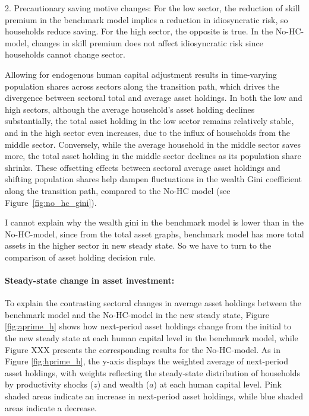 \documentclass[12pt]{article}
\begin{document}
2. Precautionary saving motive changes:
For the low sector, the reduction of skill premium in the benchmark model implies a reduction in idiosyncratic risk, so households reduce saving. For the high sector, the opposite is true. In the No-HC-model, changes in skill premium does not affect idiosyncratic risk since households cannot change sector. 


Allowing for endogenous human capital adjustment results in time-varying population shares across sectors along the transition path, which drives the divergence between sectoral total and average asset holdings. In both the low and high sectors, although the average household’s asset holding declines substantially, the total asset holding in the low sector remains relatively stable, and in the high sector even increases, due to the influx of households from the middle sector. Conversely, while the average household in the middle sector saves more, the total asset holding in the middle sector declines as its population share shrinks. These offsetting effects between sectoral average asset holdings and shifting population shares help dampen fluctuations in the wealth Gini coefficient along the transition path, compared to the No-HC model (see Figure~\ref{fig:no_hc_gini}).

{\color{red} I cannot explain why the wealth gini in the benchmark model is lower than in the No-HC-model, since from the total asset graphs, benchmark model has more total assets in the higher sector in new steady state. So we have to turn to the comparison of asset holding decision rule. }

\paragraph{Steady-state change in asset investment:} To explain the contrasting sectoral changes in average asset holdings between the benchmark model and the No-HC-model in the new steady state, Figure \ref{fig:aprime_h} shows how next-period asset holdings change from the initial to the new steady state at each human capital level in the benchmark model, while Figure XXX presents the corresponding results for the No-HC-model. As in Figure \ref{fig:hprime_h}, the y-axis displays the weighted average of next-period asset holdings, with weights reflecting the steady-state distribution of households by productivity shocks ($z$) and wealth ($a$) at each human capital level. Pink shaded areas indicate an increase in next-period asset holdings, while blue shaded areas indicate a decrease.
\end{document}
